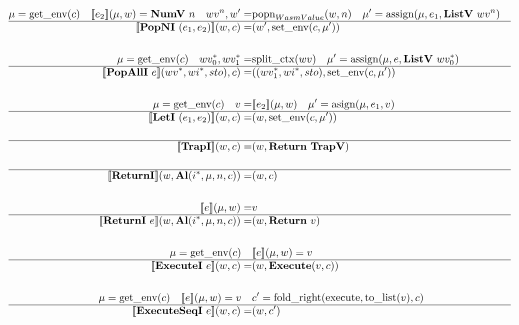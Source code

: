\begin{align*}
%
\newline \\
  \mu = \text{get\_env}(c) \quad
  \sem{e_2}(\mu, w) = \numv ~ n \quad
  wv^n, w' =& \text{popn}_{WasmValue}(w, n) \quad
  \mu' = \text{assign}(\mu, e_1, \listv ~ wv^n) \\
  \hline
  \sem{\popni ~ (e_1, e_2)}(w, c) =& (w', \text{set\_env}(c, \mu')) \\
%
\newline \\
  \mu = \text{get\_env}(c) \quad
  \seq{wv_0}, \seq{wv_1} =& \text{split\_ctx}(wv) \quad
  \mu' = \text{assign}(\mu, e, \listv ~ \seq{wv_0}) \\
  \hline
  \sem{\popalli ~ e}(\seq{wv}, \seq{wi}, sto), c)
  =&
  ((\seq{wv_1}, \seq{wi}, sto), \text{set\_env}(c, \mu')) \\
%
\newline \\
  \mu = \text{get\_env}(c) \quad
  v =& \sem{e_2}(\mu, w) \quad
  \mu' = \text{asign}(\mu, e_1, v) \\
  \hline
  \sem{\leti ~ (e_1, e_2)}(w, c)
  =&
  (w, \text{set\_env}(c, \mu')) \\
%
\newline \\
  \hline
  \sem{\trapi}(w, c) =& (w, \ret ~ \trapv) \\
%
\newline \\
  \hline
  \sem{\returni}(w, \al (\seq{i}, \mu, n, c)) =& (w, c) \\
%
\newline \\
  \sem{e}(\mu, w) =& v \\
  \hline
  \sem{\returni ~ e}(w, \al (\seq{i}, \mu, n, c)) =& (w, \ret ~ v) \\
%
\newline \\
  \mu = \text{get\_env}(c) \quad&
  \sem{e}(\mu, w) = v \\
  \hline
  \sem{\executei ~ e}(w, c) =& (w, \exe (v, c)) \\
%
\newline \\
  \mu = \text{get\_env}(c) \quad
  \sem{e}(\mu, w) = v \quad&
  c' = \text{fold\_right}(\text{execute}, \text{to\_list}(v), c) \\
  \hline
  \sem{\executeseqi ~ e}(w, c) =& (w, c') \\

\end{align*}
